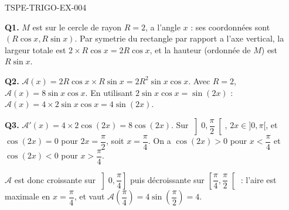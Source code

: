\begin{corrige}{TSPE-TRIGO-EX-004}

\textbf{Q1.} $M$ est sur le cercle de rayon $R=2$, a l'angle $x$ : ses coordonnées sont $(R\cos x, R\sin x)$. Par symetrie du rectangle par rapport a l'axe vertical, la largeur totale est $2 \times R\cos x = 2R\cos x$, et la hauteur (ordonnée de $M$) est $R\sin x$.

\textbf{Q2.} $\mathcal{A}(x) = 2R\cos x \times R \sin x = 2R^2 \sin x \cos x$. Avec $R=2$, $\mathcal{A}(x) = 8\sin x \cos x$. En utilisant $2\sin x\cos x = \sin(2x)$ : $\mathcal{A}(x) = 4 \times 2 \sin x \cos x = 4\sin(2x)$.

\textbf{Q3.} $\mathcal{A}'(x) = 4 \times 2\cos(2x) = 8\cos(2x)$. Sur $\left]0,\dfrac{\pi}{2}\right[$, $2x \in ]0,\pi[$, et $\cos(2x)=0$ pour $2x=\dfrac{\pi}{2}$, soit $x=\dfrac{\pi}{4}$. On a $\cos(2x)>0$ pour $x<\dfrac{\pi}{4}$ et $\cos(2x)<0$ pour $x>\dfrac{\pi}{4}$.

$\mathcal{A}$ est donc croissante sur $\left]0,\dfrac{\pi}{4}\right]$ puis décroissante sur $\left[\dfrac{\pi}{4}, \dfrac{\pi}{2}\right[$ : l'aire est maximale en $x=\dfrac{\pi}{4}$, et vaut $\mathcal{A}\!\left(\dfrac{\pi}{4}\right) = 4\sin\!\left(\dfrac{\pi}{2}\right) = 4$.

\end{corrige}
